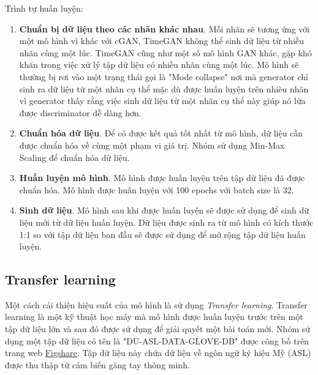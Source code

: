 Trình tự huấn luyện:
\begin{enumerate}
    \item \textbf{Chuẩn bị dữ liệu theo các nhãn khác nhau}. Mỗi nhãn sẽ tương ứng với một mô hình vì khác với cGAN, TimeGAN không thể sinh dữ liệu từ nhiều nhãn cùng một lúc. TimeGAN cũng như một số mô hình GAN khác, gặp khó khăn trong việc xử lý tập dữ liệu có nhiều nhãn cùng một lúc. Mô hình sẽ thường bị rơi vào một trạng thái gọi là "Mode collapse" nơi mà generator chỉ sinh ra dữ liệu từ một nhãn cụ thể mặc dù được huấn luyện trên nhièu nhãn vì generator thấy rằng việc sinh dữ liệu từ một nhãn cụ thể này giúp nó lừa được discriminator dễ dàng hơn.
    \item \textbf{Chuẩn hóa dữ liệu}. Để có được kết quả tốt nhất từ mô hình, dữ liệu cần được chuẩn hóa về cùng một phạm vi giá trị. Nhóm sử dụng Min-Max Scaling để chuẩn hóa dữ liệu.
    \item \textbf{Huấn luyện mô hình}. Mô hình được huấn luyện trên tập dữ liệu đã được chuẩn hóa. Mô hình được huấn luyện với 100 epochs với batch size là 32.
    \item \textbf{Sinh dữ liệu}. Mô hình sau khi được huấn luyện sẽ được sử dụng để sinh dữ liệu mới từ dữ liệu huấn luyện. Dữ liệu được sinh ra từ mô hình có kích thước 1:1 so với tập dữ liệu ban đầu sẽ được sử dụng để mở rộng tập dữ liệu huấn luyện.
\end{enumerate}

\subsection{Transfer learning}
Một cách cải thiện hiệu suất của mô hình là sử dụng \textit{Transfer learning}. Transfer learning là một kỹ thuật học máy mà mô hình được huấn luyện trước trên một tập dữ liệu lớn và sau đó được sử dụng để giải quyết một bài toán mới. Nhóm sử dụng một tập dữ liệu có tên là "DU-ASL-DATA-GLOVE-DB" được công bố trên trang web \href{https://figshare.com/articles/dataset/ASL-Sensor-Dataglove-Dataset_zip/20031017?file=35776586}{Figshare}. Tập dữ liệu này chứa dữ liệu về ngôn ngữ ký hiệu Mỹ (ASL) được thu thập từ cảm biến găng tay thông minh.

